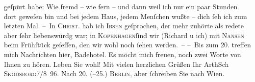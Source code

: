 \begin{ledgroupsized}[t]{13cm}
               geſpürt habe: Wie fremd – wie fern – und dann weil ich nur ein paar Stunden dort
               geweſen bin und bei jedem Haus, jedem Menſchen {\pb}wußte –
               dich ſeh ich zum letzten Mal.\pend
           \pstart
           – In \textsc{Christ}. hab ich \textsc{Ibsen} geſprochen, der mehr zuhörte als redete aber ſehr liebenswürdg war; in \textsc{Kopenhagen}ſind wir (Richard u ich) mit \textsc{Nansen} beim Frühſtück geſeſſen, den wir wohl noch ſehen werden. –\pend
           \pstart
           – Bis zum 20. treffen mich Nachrichten hier, Badehotel. Es möcht mich freuen, noch zwei Worte von Ihnen zu
               hören.\pend
           \pstart Leben Sie wohl! Mit vielen herzlichen Grüßen Ihr \spacefill\mbox{ArthSch}\pend{}\pstart
           \textsc{Skodsborg}7/8 96. \pend
           \pstart
           Nach 20. (–25.) \textsc{Berlin}, aber ſchreiben Sie nach Wien.\pend
           
         
         \endnumbering{}\end{ledgroupsized}  \newcommand{\dateiname}{L00579}\newcommand{\titel}{Arthur Schnitzler an Hugo von Hofmannsthal, 7. 8. 1896}\newcommand{\editorInnen}{Martin Anton Müller und Gerd-Hermann Susen}
      